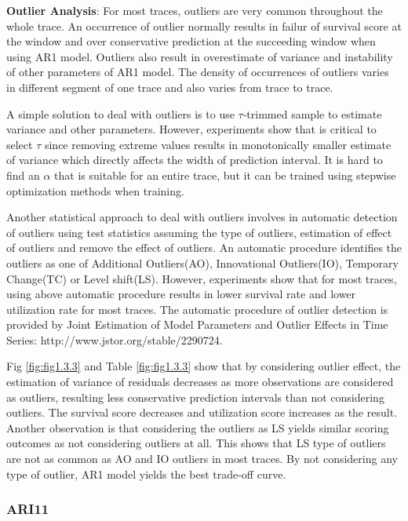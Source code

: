 \documentclass{article}
\begin{document}
\begin{flushleft}
\textbf{Outlier Analysis}: For most traces, outliers are very common throughout
the whole trace. An occurrence of outlier normally results in failur of survival
score at the window and over conservative prediction at the succeeding window
when using AR1 model. Outliers also result in overestimate of variance and
instability of other parameters of AR1 model. The density of occurrences of
outliers varies in different segment of one trace and also varies from trace to
trace.  

A simple solution to deal with outliers is to use $\tau$-trimmed sample to
estimate variance and other parameters. However, experiments show that is
critical to select $\tau$ since removing extreme values results in monotonically
smaller estimate of variance which directly affects the width of prediction
interval. It is hard to find an $\alpha$ that is suitable for an entire trace,
but it can be trained using stepwise optimization methods when training.

Another statistical approach to deal with outliers involves in automatic
detection of outliers using test statistics assuming the type of outliers,
estimation of effect of outliers and remove the effect of outliers. An automatic
procedure identifies the outliers as one of Additional Outliers(AO),
Innovational Outliers(IO), Temporary Change(TC) or Level shift(LS). However,
experiments show that for most traces, using above automatic procedure results
in lower survival rate and lower utilization rate for most traces. The automatic
procedure of outlier detection is provided by Joint Estimation of Model
Parameters and Outlier Effects in Time Series:
http://www.jstor.org/stable/2290724.

Fig \ref{fig:fig1.3.3} and Table \ref{fig:fig1.3.3} show that by considering
outlier effect, the estimation of variance of residuals decreases as more
observations are considered as outliers, resulting less conservative prediction
intervals than not considering outliers. The survival score decreases and
utilization score increases as the result. Another observation is that
considering the outliers as LS yields similar scoring outcomes as not
considering outliers at all. This shows that LS type of outliers are not as
common as AO and IO outliers in most traces. By not considering any type of
outlier, AR1 model yields the best trade-off curve.
\end{flushleft}

\subsubsection{ARI11}
\end{document}
